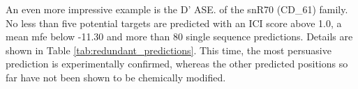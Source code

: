 An even more impressive example is the D' ASE. of the snR70 (CD\_61)
family.  No less than five potential targets are predicted with an ICI
score above 1.0, a mean mfe below -11.30 and more than 80 single sequence
predictions. Details are shown in Table
\ref{tab:redundant_predictions}. This time, the most persuasive prediction
is experimentally confirmed, whereas the other predicted positions so far
have not been shown to be chemically modified.

